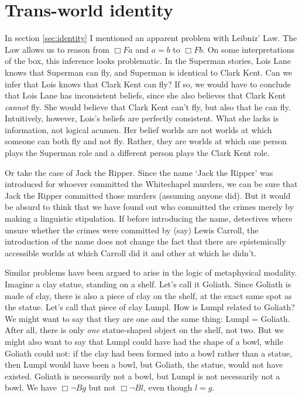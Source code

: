 \section{Trans-world identity}\label{sec:twi}

In section \ref{sec:identity} I mentioned an apparent problem with Leibniz' Law.
The Law allows us to reason from $\Box Fa$ and $a\!=\!b$ to $\Box Fb$. On some
interpretations of the box, this inference looks problematic. In the Superman
stories, Lois Lane knows that Superman can fly, and Superman is identical to
Clark Kent. Can we infer that Lois knows that Clark Kent can fly?
If so, we would have to conclude that Lois Lane has inconsistent beliefs,
since she also believes that Clark Kent \emph{cannot} fly. She would believe
that Clark Kent can't fly, but also that he can fly. Intuitively, however,
Lois's beliefs are perfectly consistent. What she lacks is information, not
logical acumen. Her belief worlds are not worlds at which someone can both fly
and not fly. Rather, they are worlds at which one person plays the Superman role
and a different person plays the Clark Kent role.

Or take the case of Jack the Ripper. Since the name `Jack the Ripper' was
introduced for whoever committed the Whitechapel murders, we can be sure that
Jack the Ripper committed those murders (assuming anyone did). But it would be
absurd to think that we have found out who committed the crimes merely by making
a linguistic stipulation. If before introducing the name, detectives where
unsure whether the crimes were committed by (say) Lewis Carroll, the
introduction of the name does not change the fact that there are epistemically
accessible worlds at which Carroll did it and other at which he didn't.

Similar problems have been argued to arise in the logic of metaphysical
modality. Imagine a clay statue, standing on a shelf. Let's call it
Goliath. Since Goliath is made of clay, there is also a piece of clay on the
shelf, at the exact same spot as the statue. Let's call that piece of clay
Lumpl. How is Lumpl related to Goliath? We might want to say that they are one
and the same thing: Lumpl = Goliath. After all, there is only \emph{one}
statue-shaped object on the shelf, not two. But we might also want to say that
Lumpl could have had the shape of a bowl, while Goliath could not: if the clay
had been formed into a bowl rather than a statue, then Lumpl would have been a
bowl, but Goliath, the statue, would not have existed. Goliath is necessarily
not a bowl, but Lumpl is not necessarily not a bowl. We have $\Box \neg Bg$ but
not $\Box \neg Bl$, even though $l\!=\!g$.

